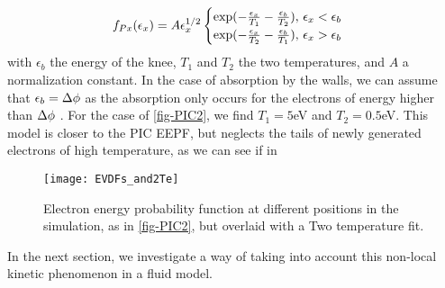 \begin{equation}
  f_{Px}(\epsilon_x) = A \epsilon_x^{1/2}
\begin{cases}
  \exp( - \frac{\epsilon_x}{T_1} -  \frac{\epsilon_b }{T_2}) , \, \epsilon_x < \epsilon_b \\
  \exp( - \frac{\epsilon_x}{T_2} - \frac{\epsilon_b }{T_1} ) , \, \epsilon_x > \epsilon_b
\end{cases}
\end{equation}
with $\epsilon_b$ the energy of the knee, $T_1$ and $T_2$ the two temperatures, and $A$ a normalization constant.
In the case of absorption by the walls, we can assume that $\epsilon_b = \Delta \phi$ as the absorption only occurs for the electrons of energy higher than $\Delta \phi$ .
For the case of \cref{fig-PIC2}, we find $T_{1}=5$eV and $T_2=0.5$eV.
This model is closer to the \ac{PIC} EEPF, but neglects the tails of newly generated electrons of high temperature, as we can see if in 


\begin{figure}[hbtp]
  \centering
  \texttt{[image: EVDFs\_and2Te]}
  \caption{Electron energy probability function at different positions in the simulation, as in \cref{fig-PIC2}, but overlaid with a Two temperature fit. }
  \label{fig-PIC3}
\end{figure}

In the next section, we investigate a way of taking into account this non-local kinetic phenomenon in a fluid model.
